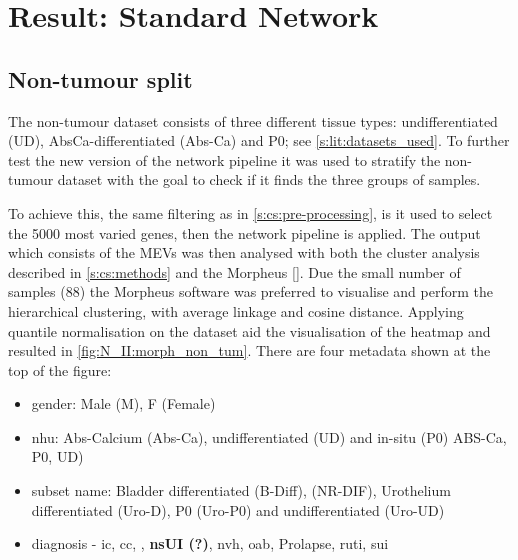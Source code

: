 \section{Result: Standard Network}  \label{s:N_II:std_net}

\vspace{3mm}
\vspace{3mm}

\subsection{Non-tumour split} \label{s:N_II:std}

The non-tumour dataset consists of three different tissue types: undifferentiated (UD), AbsCa-differentiated (Abs-Ca) and P0; see \cref{s:lit:datasets_used}. To further test the new version of the network pipeline it was used to stratify the non-tumour dataset with the goal to check if it finds the three groups of samples. 

To achieve this, the same filtering as in \cref{s:cs:pre-processing}, is it used to select the 5000 most varied genes, then the network pipeline is applied. The output which consists of the MEVs was then analysed with both the cluster analysis described in \cref{s:cs:methods} and the Morpheus \ref{}. Due the small number of samples (88) the Morpheus software was preferred to visualise and perform the hierarchical clustering, with average linkage and cosine distance. Applying quantile normalisation on the dataset aid the visualisation of the heatmap and resulted in \cref{fig:N_II:morph_non_tum}. There are four metadata shown at the top of the figure: 
\begin{itemize}
    \item gender: Male (M), F (Female)
    \item \acrfull{nhu}: Abs-Calcium (Abs-Ca), undifferentiated (UD) and in-situ (P0)
    ABS-Ca, P0, UD)
    \item subset name: Bladder differentiated (B-Diff), (NR-DIF), Urothelium differentiated (Uro-D), P0 (Uro-P0) and undifferentiated (Uro-UD)
    \item diagnosis - \acrfull{ic}, \acrfull{cc},  , \textbf{nsUI (?)},  \acrfull{nvh}, \acrfull{oab}, Prolapse, \acrfull{ruti}, \acrfull{sui}
\end{itemize} 

